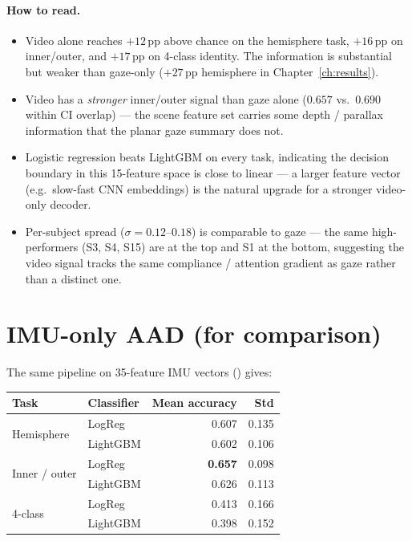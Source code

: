 \paragraph{How to read.}
\begin{itemize}
  \item Video alone reaches $+12$\,pp above chance on the hemisphere
        task, $+16$\,pp on inner/outer, and $+17$\,pp on 4-class
        identity. The information is substantial but weaker than
        gaze-only ($+27$\,pp hemisphere in Chapter~\ref{ch:results}).
  \item Video has a \emph{stronger} inner/outer signal than gaze
        alone ($0.657$ vs.\ $0.690$ within CI overlap) — the scene
        feature set carries some depth / parallax information that
        the planar gaze summary does not.
  \item Logistic regression beats LightGBM on every task, indicating
        the decision boundary in this 15-feature space is close to
        linear — a larger feature vector (e.g.\ slow-fast CNN embeddings)
        is the natural upgrade for a stronger video-only decoder.
  \item Per-subject spread ($\sigma = 0.12$--$0.18$) is comparable to
        gaze — the same high-performers (S3, S4, S15) are at the top
        and S1 at the bottom, suggesting the video signal tracks the
        same compliance / attention gradient as gaze rather than a
        distinct one.
\end{itemize}

\section{IMU-only AAD (for comparison)}

The same pipeline on 35-feature IMU vectors
() gives:

\begin{table}[ht]
\centering
\begin{tabular}{llrr}
\toprule
Task & Classifier & Mean accuracy & Std \\
\midrule
\multirow{2}{*}{Hemisphere}    & LogReg   & 0.607 & 0.135 \\
                               & LightGBM & 0.602 & 0.106 \\
\multirow{2}{*}{Inner / outer} & LogReg   & \textbf{0.657} & 0.098 \\
                               & LightGBM & 0.626 & 0.113 \\
\multirow{2}{*}{4-class}       & LogReg   & 0.413 & 0.166 \\
                               & LightGBM & 0.398 & 0.152 \\
\bottomrule
\end{tabular}
\end{table}

